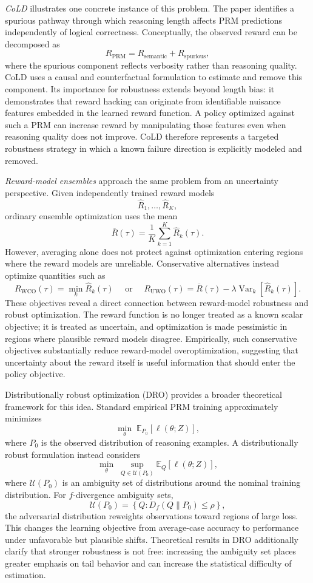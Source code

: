 \documentclass[11pt]{article}
\begin{document}
\emph{CoLD} illustrates one concrete instance of this problem. The paper identifies a spurious pathway through which reasoning length affects PRM predictions independently of logical correctness. Conceptually, the observed reward can be decomposed as
\[
R_{\mathrm{PRM}}
=
R_{\mathrm{semantic}}
+
R_{\mathrm{spurious}},
\]
where the spurious component reflects verbosity rather than reasoning quality. CoLD uses a causal and counterfactual formulation to estimate and remove this component. Its importance for robustness extends beyond length bias: it demonstrates that reward hacking can originate from identifiable nuisance features embedded in the learned reward function. A policy optimized against such a PRM can increase reward by manipulating those features even when reasoning quality does not improve. CoLD therefore represents a targeted robustness strategy in which a known failure direction is explicitly modeled and removed.

\emph{Reward-model ensembles} approach the same problem from an uncertainty perspective. Given independently trained reward models
\[
\widehat{R}_1,\ldots,\widehat{R}_K,
\]
ordinary ensemble optimization uses the mean
\[
\overline{R}(\tau)
=
\frac{1}{K}
\sum_{k=1}^{K}
\widehat{R}_k(\tau).
\]
However, averaging alone does not protect against optimization entering regions where the reward models are unreliable. Conservative alternatives instead optimize quantities such as
\[
R_{\mathrm{WCO}}(\tau)
=
\min_{k}
\widehat{R}_k(\tau)
\quad 
\text{ or }
\quad
R_{\mathrm{UWO}}(\tau)
=
\overline{R}(\tau)
-
\lambda
\operatorname{Var}_{k}
\left[
\widehat{R}_k(\tau)
\right].
\]
These objectives reveal a direct connection between reward-model robustness and robust optimization. The reward function is no longer treated as a known scalar objective; it is treated as uncertain, and optimization is made pessimistic in regions where plausible reward models disagree. Empirically, such conservative objectives substantially reduce reward-model overoptimization, suggesting that uncertainty about the reward itself is useful information that should enter the policy objective.

Distributionally robust optimization (DRO) provides a broader theoretical framework for this idea. Standard empirical PRM training approximately minimizes
\[
\min_{\theta}
\;
\mathbb{E}_{P_0}
\left[
\ell(\theta;Z)
\right],
\]
where $P_0$ is the observed distribution of reasoning examples. A distributionally robust formulation instead considers
\[
\min_{\theta}
\;
\sup_{Q\in\mathcal{U}(P_0)}
\mathbb{E}_{Q}
\left[
\ell(\theta;Z)
\right],
\]
where $\mathcal{U}(P_0)$ is an ambiguity set of distributions around the nominal training distribution. For $f$-divergence ambiguity sets,
\[
\mathcal{U}(P_0)
=
\left\{
Q:
D_f(Q\|P_0)\leq\rho
\right\},
\]
the adversarial distribution reweights observations toward regions of large loss. This changes the learning objective from average-case accuracy to performance under unfavorable but plausible shifts. Theoretical results in DRO additionally clarify that stronger robustness is not free: increasing the ambiguity set places greater emphasis on tail behavior and can increase the statistical difficulty of estimation.
\end{document}
